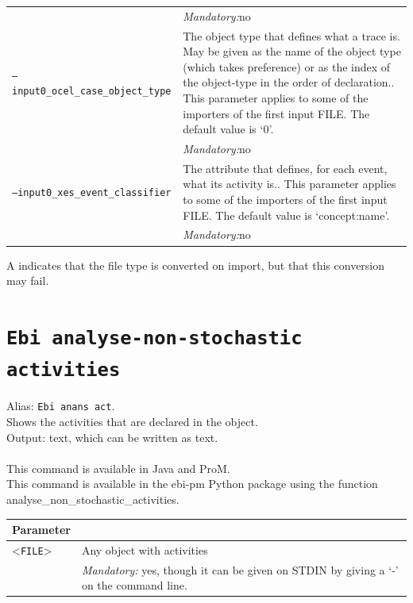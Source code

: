 {\begin{tabularx}{\linewidth}{lX}
&\textit{Mandatory:}\quad no\\
\texttt{--input0\_ocel\_case\_object\_type} & The object type that defines what a trace is. May be given as the name of the object type (which takes preference) or as the index of the object-type in the order of declaration.. This parameter applies to some of the importers of the first input FILE. The default value is `0'.\\
&\textit{Mandatory:}\quad no\\
\texttt{--input0\_xes\_event\_classifier} & The attribute that defines, for each event, what its activity is.. This parameter applies to some of the importers of the first input FILE. The default value is `concept:name'.\\
&\textit{Mandatory:}\quad no\\
\bottomrule
\end{tabularx}
A \textdagger{} indicates that the file type is converted on import, but that this conversion may fail.
\clearpage\section{\texttt{Ebi analyse-non-stochastic activities}}
\label{command:Ebi analyse-non-stochastic activities}
Alias: \texttt{Ebi anans act}.\\
Shows the activities that are declared in the object.\\
\noindent Output: text, which can be written as  text.\\
\\This command is available in Java and ProM.
\\This command is available in the ebi-pm Python package using the function analyse\_non\_stochastic\_activities.
\begin{tabularx}{\linewidth}{lX}
\toprule
Parameter \\\midrule
<\texttt{FILE}>&Any object with activities\\
&\textit{Mandatory:} \quad yes, though it can be given on STDIN by giving a `-' on the command line.\\

\end{tabularx}}
